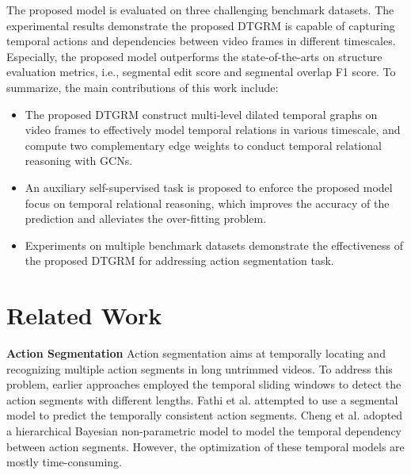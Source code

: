 \documentclass[letterpaper]{article} \usepackage{aaai21}  \usepackage{times}  \usepackage{helvet} \usepackage{courier}  \usepackage[hyphens]{url}  \usepackage{graphicx} \usepackage{mathtools}
\begin{document}
The proposed model is evaluated on three challenging benchmark datasets. The experimental results demonstrate the proposed DTGRM is capable of capturing temporal actions and dependencies between video frames in different timescales. Especially, the proposed model outperforms the state-of-the-arts on structure evaluation metrics, i.e., segmental edit score and segmental overlap F1 score. To summarize, the main contributions of this work include:

\begin{itemize}
\item The proposed DTGRM construct multi-level dilated temporal graphs on video frames to effectively model temporal relations in various timescale, and compute two complementary edge weights to conduct temporal relational reasoning with GCNs.
\vspace{-0.1cm}
\item An auxiliary self-supervised task is proposed to enforce the proposed model focus on temporal relational reasoning, which improves the accuracy of the prediction and alleviates the over-fitting problem.
\vspace{-0.1cm}
\item Experiments on multiple benchmark datasets demonstrate the effectiveness of the proposed DTGRM for addressing action segmentation task.
\end{itemize}

\section{Related Work}
\textbf{Action Segmentation}
Action segmentation aims at temporally locating and recognizing multiple action segments in long untrimmed videos. To address this problem, earlier approaches \cite{rohrbach2012database,karaman2014fast} employed the temporal sliding windows to detect the action segments with different lengths. Fathi et al. \cite{fathi2011understanding,fathi2011learning,fathi2013modeling} attempted to use a segmental model to predict the temporally consistent action segments. Cheng et al. \cite{cheng2014temporal} adopted a hierarchical Bayesian non-parametric model to model the temporal dependency between action segments. However, the optimization of these temporal models are mostly time-consuming. 
\end{document}
